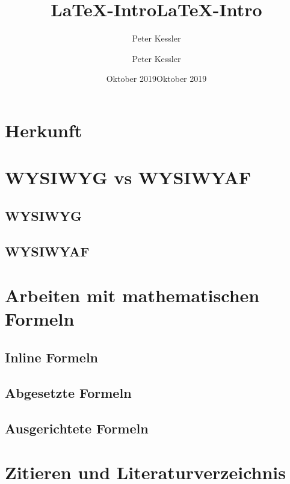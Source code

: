 \documentclass[ 12pt, a4paper, parskip=full]{scrartcl}
\title{\LaTeX-Intro}          %
\author{Peter Kessler}        %
\date{Oktober 2019}           %
\title{\LaTeX-Intro}          %
\author{Peter Kessler}        %
\date{Oktober 2019}           %
\begin{document}
\maketitle
\thispagestyle{empty}         

\pagebreak
\tableofcontents

\pagebreak 
\section{Herkunft}


\pagebreak
\section{WYSIWYG vs WYSIWYAF}

\subsection{WYSIWYG}


\subsection{WYSIWYAF}


\pagebreak
\section{Arbeiten mit mathematischen Formeln}


\subsection{Inline Formeln}


\subsection{Abgesetzte Formeln}


\subsection{Ausgerichtete Formeln}


\pagebreak
\section{Zitieren und Literaturverzeichnis}


\pagebreak


\printbibliography[title={Literatur-/Quellenverzeichnis}]        
\end{document}
